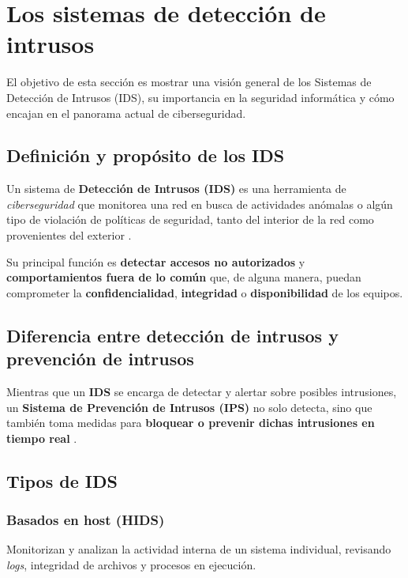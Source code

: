 \documentclass[12pt,a4paper]{report}
\begin{document}
\section{Los sistemas de detección de intrusos}

El objetivo de esta sección es mostrar una visión general de los Sistemas de Detección de Intrusos (IDS), su importancia en la seguridad informática y cómo encajan en el panorama actual de ciberseguridad.

\subsection{Definición y propósito de los IDS}

Un sistema de \textbf{Detección de Intrusos (IDS)} es una herramienta de \textit{ciberseguridad} que monitorea una red en busca de actividades anómalas o algún tipo de violación de políticas de seguridad, tanto del interior de la red como provenientes del exterior \cite{cichonski2012guide}.\newline

Su principal función es \textbf{detectar accesos no autorizados} y \textbf{comportamientos fuera de lo común} que, de alguna manera, puedan comprometer la \textbf{confidencialidad}, \textbf{integridad} o \textbf{disponibilidad} de los equipos.


\subsection{Diferencia entre detección de intrusos y prevención de intrusos}

Mientras que un \textbf{IDS} se encarga de detectar y alertar sobre posibles intrusiones, un \textbf{Sistema de Prevención de Intrusos (IPS)} no solo detecta, sino que también toma medidas para \textbf{bloquear o prevenir dichas intrusiones en tiempo real} \cite{abbas2023ids}.

\subsection{Tipos de IDS}

\subsubsection{Basados en host (HIDS)}

Monitorizan y analizan la actividad interna de un sistema individual, revisando \textit{logs}, integridad de archivos y procesos en ejecución.
\end{document}
